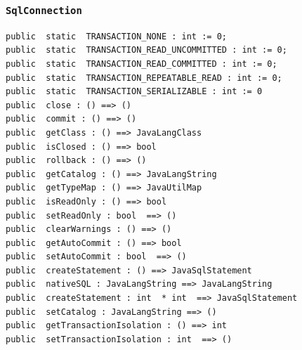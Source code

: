 \documentclass[\pformat,12pt]{article}
\begin{document}
\subsubsection{\texttt{SqlConnection}}
\begin{small}
\begin{verbatim}
public  static  TRANSACTION_NONE : int := 0;
public  static  TRANSACTION_READ_UNCOMMITTED : int := 0;
public  static  TRANSACTION_READ_COMMITTED : int := 0;
public  static  TRANSACTION_REPEATABLE_READ : int := 0;
public  static  TRANSACTION_SERIALIZABLE : int := 0
public  close : () ==> ()
public  commit : () ==> ()
public  getClass : () ==> JavaLangClass
public  isClosed : () ==> bool
public  rollback : () ==> ()
public  getCatalog : () ==> JavaLangString
public  getTypeMap : () ==> JavaUtilMap
public  isReadOnly : () ==> bool
public  setReadOnly : bool  ==> ()
public  clearWarnings : () ==> ()
public  getAutoCommit : () ==> bool
public  setAutoCommit : bool  ==> ()
public  createStatement : () ==> JavaSqlStatement
public  nativeSQL : JavaLangString ==> JavaLangString
public  createStatement : int  * int  ==> JavaSqlStatement
public  setCatalog : JavaLangString ==> ()
public  getTransactionIsolation : () ==> int
public  setTransactionIsolation : int  ==> ()
\end{verbatim}
\end{small}
\end{document}
